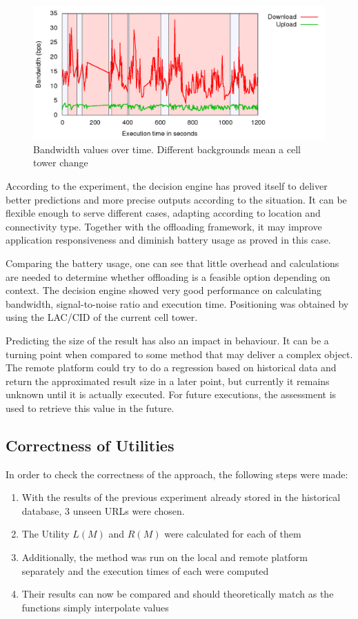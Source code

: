 \documentclass[10pt, conference, letterpaper]{IEEEtran}
\begin{document}
\begin{figure}[!b]
  \centering
  \includegraphics[width=1\textwidth]{results/plots/bw-fluctuation/executions.png}
  \caption{Bandwidth values over time. Different backgrounds mean a cell tower change}
  \label{fig:bwtower}
\end{figure}


  According to the experiment, the decision engine has proved itself to deliver better predictions and more precise outputs according to the situation. It can be flexible enough to serve different cases, adapting according to location and connectivity type. Together with the offloading framework, it may improve application responsiveness and diminish battery usage as proved in this case.
  
  Comparing the battery usage, one can see that little overhead and calculations are needed to determine whether offloading is a feasible option depending on context. The decision engine showed very good performance on calculating bandwidth, signal-to-noise ratio and execution time. Positioning was obtained by using the LAC/CID of the current cell tower.

  Predicting the size of the result has also an impact in behaviour. It can be a turning point when compared to some method that may deliver a complex object. The remote platform could try to do a regression based on historical data and return the approximated result size in a later point, but currently it remains unknown until it is actually executed. For future executions, the assessment is used to retrieve this value in the future.

  \subsection{Correctness of Utilities}

  In order to check the correctness of the approach, the following steps were made:
  \begin{enumerate}
    \item With the results of the previous experiment already stored in the historical database, 3 unseen URLs were chosen.
    \item The Utility $L(M)$ and $R(M)$ were calculated for each of them
    \item Additionally, the method was run on the local and remote platform separately and the execution times of each were computed
    \item Their results can now be compared and should theoretically match as the functions simply interpolate values
  \end{enumerate}
\end{document}
